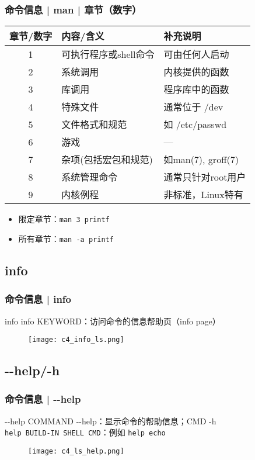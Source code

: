 \begin{frame}[fragile]
  \frametitle{命令信息 | man | 章节（数字）}
  \begin{table}
    \centering
    \begin{tabular}{cll}
      \hline
      \rowcolor{blue!50}章节/数字 & 内容/含义 & 补充说明\\
      \hline
      1 & 可执行程序或shell命令 & 可由任何人启动 \\
      2 & 系统调用 & 内核提供的函数\\
      3 & 库调用 & 程序库中的函数\\
      4 & 特殊文件 & 通常位于 /dev\\
      5 & 文件格式和规范 & 如 /etc/passwd\\
      6 & 游戏 & ---\\
      7 & 杂项(包括宏包和规范) & 如man(7), groff(7)\\
      8 & 系统管理命令 & 通常只针对root用户\\
      9 & 内核例程 & 非标准，Linux特有\\
      \hline
    \end{tabular}
  \end{table}
  \pause
  \begin{itemize}
    \item 限定章节：\verb|man 3 printf|
    \item 所有章节：\verb|man -a printf|
  \end{itemize}
\end{frame}

\subsection{info}
\begin{frame}
  \frametitle{命令信息 | info}
  \begin{block}{info}
    info KEYWORD：访问命令的信息帮助页（info page）
  \end{block}
  \begin{figure}
    \centering
    \texttt{[image: c4\_info\_ls.png]}
  \end{figure}
\end{frame}

\subsection{-\!-help/-h}
\begin{frame}[fragile]
  \frametitle{命令信息 | -\!-help}
  \begin{block}{-\!-help}
    \alert{COMMAND -\!-help}：显示命令的帮助信息；\alert{CMD -h}\\
    \verb|help BUILD-IN SHELL CMD|：例如 \verb|help echo|
  \end{block}
  \vspace{-0.2cm}
  \begin{figure}
    \centering
    \texttt{[image: c4\_ls\_help.png]}
  \end{figure}
\end{frame}

